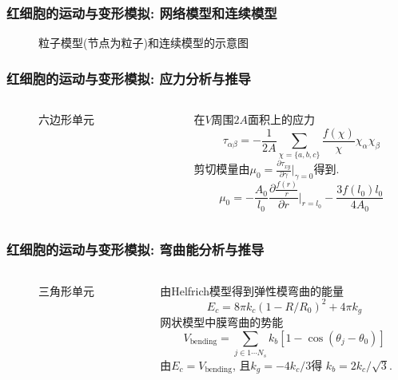 \begin{frame}
\frametitle{红细胞的运动与变形模拟: 网络模型和连续模型}
\note{\textcolor{red}{350-375s}}
\begin{figure}[!htb]
\centering

\caption{\label{fig:network2continuum} 粒子模型(节点为粒子)和连续模型的示意图}
\end{figure}
\end{frame}

\begin{frame}
\frametitle{红细胞的运动与变形模拟: 应力分析与推导}
\note{\textcolor{red}{375-390s}}
\begin{columns}
\begin{column}[c]{0.5\textwidth}
\begin{figure}[!htb]
\centering

\caption{\label{fig:network2continuum} 六边形单元}
\end{figure}
\end{column}
\begin{column}[c]{0.5\textwidth}
在$V$周围$2A$面积上的应力
\[
\tau_{\alpha\beta} = -\frac{1}{2A}\sum_{\chi=\{a,b,c\}} \frac{f(\chi)}{\chi}\chi_\alpha \chi_\beta
\]
剪切模量由$\mu_0=\frac{\partial \tau_{xy}}{\partial \gamma}|_{\gamma=0}$得到.
\[
\mu_0 = -\frac{A_0}{l_0}\frac{\partial \frac{f(r)}{r}}{\partial r}\bigg|_{r=l_0}-\frac{3f(l_0)l_0}{4A_0}
\]

\end{column}
\end{columns}
\end{frame}

\begin{frame}
\frametitle{红细胞的运动与变形模拟: 弯曲能分析与推导}
\note{\textcolor{red}{390-405s}}
\begin{columns}
\begin{column}[c]{0.5\textwidth}
\begin{figure}[!htb]
\centering

\vspace{-2em}
\caption{\label{fig:network2continuum} 三角形单元}
\end{figure}
\end{column}
\begin{column}[c]{0.5\textwidth}
由Helfrich模型得到弹性模弯曲的能量
\[
E_c= 8\pi k_c(1-R/R_0)^2+4\pi k_g
\]
网状模型中膜弯曲的势能
\[
V_{\text{bending}}=\sum_{j\in1\cdots N_s}k_b[1-\cos(\theta_j-\theta_0)]
\]
由$E_c=V_{\text{bending}}$, 且$k_g=-4k_c/3$得
$k_b=2k_c/\sqrt{3}$.
\end{column}
\end{columns}
\end{frame}


